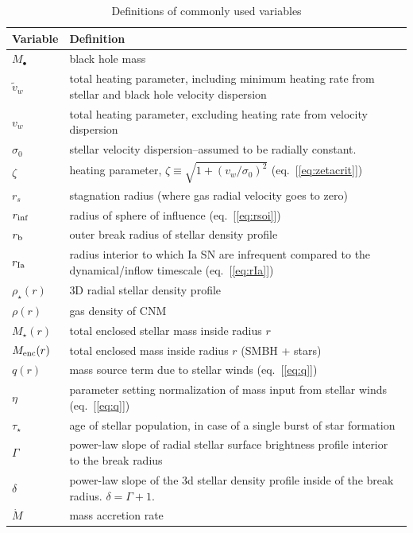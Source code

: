 \documentclass[usenatbib,fleqn]{mn2e}
\begin{document}
\begin{table}
\begin{threeparttable}
\begin{minipage}{18cm}
\caption{Definitions of commonly used variables}
\begin{tabular}{ll}
\hline
{Variable} & {Definition} \\
\hline
$M_{\bullet}$ & black hole mass \\
$\tilde{v}_{w}$ & total heating parameter, including minimum heating
rate from stellar and black hole velocity dispersion \\
$v_{w}$ & total heating parameter, excluding heating rate from
velocity dispersion \\
$\sigma_0$ & stellar velocity dispersion--assumed to be radially constant.\\
$\zeta$ & heating parameter, $\zeta \equiv \sqrt{1 + (v_w/\sigma_0)^2}$ (eq.~[\ref{eq:zetacrit}])\\
$r_{s}$ & stagnation radius (where gas radial velocity goes to zero) \\
$r_{\rm inf}$ & radius of sphere of influence (eq.~[\ref{eq:rsoi}]) \\
$r_{\rm b}$ & outer break radius of stellar density profile \\ 
$r_{\rm Ia}$ & radius interior to which Ia SN are infrequent compared to the dynamical/inflow timescale (eq.~[\ref{eq:rIa}]) \\ 
$\rho_{\star}(r)$ & 3D radial stellar density profile \\
$\rho(r)$ & gas density of CNM \\
$M_{\star}(r)$ & total enclosed stellar mass inside radius $r$ \\
$M_{\rm enc}(r)$ & total enclosed mass inside radius $r$ (SMBH + stars) \\
$q(r)$ & mass source term due to stellar winds (eq.~[\ref{eq:q}]) \\
$\eta$ & parameter setting normalization of mass input from stellar winds (eq.~[\ref{eq:q}]) \\
$\tau_{\star}$ & age of stellar population, in case of a single burst of star formation \\
$\Gamma$ & power-law slope of radial stellar surface brightness
profile interior to the break radius \\
$\delta$ & power-law slope of the 3d stellar density profile inside of
the break radius. $\delta=\Gamma+1$.\\
$\dot{M}$ & mass accretion rate  \\

\end{tabular}
\end{minipage}
\end{threeparttable}
\end{table}
\end{document}
